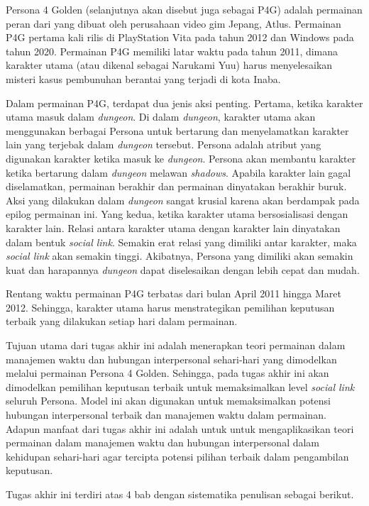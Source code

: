 Persona 4 Golden (selanjutnya akan disebut juga sebagai P4G) adalah permainan peran dari yang dibuat oleh perusahaan video gim Jepang, Atlus. Permainan P4G pertama kali rilis di PlayStation Vita pada tahun 2012 dan Windows pada tahun 2020. Permainan P4G memiliki latar waktu pada tahun 2011, dimana karakter utama (atau dikenal sebagai Narukami Yuu) harus menyelesaikan misteri kasus pembunuhan berantai yang terjadi di kota Inaba.

Dalam permainan P4G, terdapat dua jenis aksi penting. Pertama, ketika karakter utama masuk dalam \textit{dungeon}. Di dalam \textit{dungeon}, karakter utama akan menggunakan berbagai Persona untuk bertarung dan menyelamatkan karakter lain yang terjebak dalam \textit{dungeon} tersebut. Persona adalah atribut yang digunakan karakter ketika masuk ke \textit{dungeon}. Persona akan membantu karakter ketika bertarung dalam \textit{dungeon} melawan \textit{shadows}. Apabila karakter lain gagal diselamatkan, permainan berakhir dan permainan dinyatakan berakhir buruk. Aksi yang dilakukan dalam \textit{dungeon} sangat krusial karena akan berdampak pada epilog permainan ini. Yang kedua, ketika karakter utama bersosialisasi dengan karakter lain. Relasi antara karakter utama dengan karakter lain dinyatakan dalam bentuk \textit{social link}. Semakin erat relasi yang dimiliki antar karakter, maka \textit{social link} akan semakin tinggi. Akibatnya, Persona yang dimiliki akan semakin kuat dan harapannya \textit{dungeon} dapat diselesaikan dengan lebih cepat dan mudah.

Rentang waktu permainan P4G terbatas dari bulan April 2011 hingga Maret 2012. Sehingga, karakter utama harus menstrategikan pemilihan keputusan terbaik yang dilakukan setiap hari dalam permainan.

Tujuan utama dari tugas akhir ini adalah menerapkan teori permainan dalam manajemen waktu dan hubungan interpersonal sehari-hari yang dimodelkan melalui permainan Persona 4 Golden. Sehingga, pada tugas akhir ini akan dimodelkan pemilihan keputusan terbaik untuk memaksimalkan level \textit{social link} seluruh Persona. Model ini akan digunakan untuk memaksimalkan potensi hubungan interpersonal terbaik dan manajemen waktu dalam permainan. Adapun manfaat dari tugas akhir ini adalah untuk untuk mengaplikasikan teori permainan dalam manajemen waktu dan hubungan interpersonal dalam kehidupan sehari-hari agar tercipta potensi pilihan terbaik dalam pengambilan keputusan.

Tugas akhir ini terdiri atas 4 bab dengan sistematika penulisan sebagai berikut.

